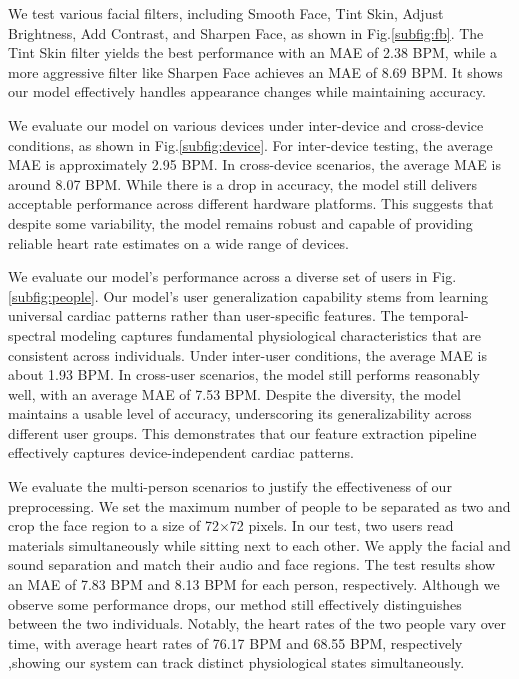 We test various facial filters, including Smooth Face, Tint Skin, Adjust Brightness, Add Contrast, and Sharpen Face, as shown in Fig.\ref{subfig:fb}. 
The Tint Skin filter yields the best performance with an MAE of 2.38 BPM, while a more aggressive filter like Sharpen Face achieves an MAE of 8.69 BPM. It shows our model effectively handles appearance changes while maintaining accuracy.

We evaluate our model on various devices under inter-device and cross-device conditions, as shown in Fig.\ref{subfig:device}.
For inter-device testing, the average MAE is approximately 2.95 BPM. In cross-device scenarios, the average MAE is around 8.07 BPM. While there is a drop in accuracy, the model still delivers acceptable performance across different hardware platforms. 
This suggests that despite some variability, the model remains robust and capable of providing reliable heart rate estimates on a wide range of devices. 

We evaluate our model's performance across a diverse set of users in Fig.\ref{subfig:people}. Our model's user generalization capability stems from learning universal cardiac patterns rather than user-specific features. The temporal-spectral modeling captures fundamental physiological characteristics that are consistent across individuals. Under inter-user conditions, the average MAE is about 1.93 BPM. In cross-user scenarios, the model still performs reasonably well, with an average MAE of 7.53 BPM. Despite the diversity, the model maintains a usable level of accuracy, underscoring its generalizability across different user groups. This demonstrates that our feature extraction pipeline effectively captures device-independent cardiac patterns.






 We evaluate the multi-person scenarios to justify the effectiveness of our preprocessing. 
We set the maximum number of people to be separated as two and crop the face region to a size of 72$\times$72 pixels. 
In our test, two users read materials simultaneously while sitting next to each other. We apply the facial and sound separation and match their audio and face regions. The test results show an MAE of 7.83 BPM and 8.13 BPM for each person, respectively. 
Although we observe some performance drops, our method still effectively distinguishes between the two individuals. Notably, the heart rates of the two people vary over time, with average heart rates of 76.17 BPM and 68.55 BPM, respectively ,showing our system can track distinct physiological states simultaneously.

